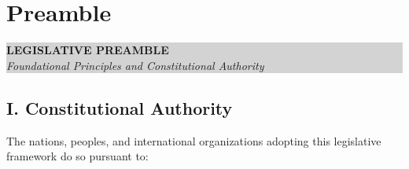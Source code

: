 

\chapter*{Preamble}

\vspace{0.5cm}

\noindent\colorbox{lightgray}{%
    \parbox{\dimexpr\textwidth-2\fboxsep\relax}{%
        \vspace{10pt}
        \sffamily\small
        \textbf{\textcolor{legislativeblue}{LEGISLATIVE PREAMBLE}}\\
        \textit{Foundational Principles and Constitutional Authority}
        \vspace{10pt}
    }%
}

\vspace{1cm}

\section*{I. Constitutional Authority}

The nations, peoples, and international organizations adopting this legislative framework do so pursuant to:

